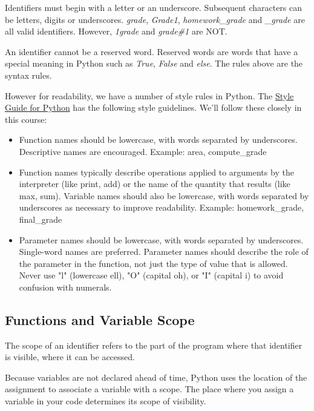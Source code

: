 \documentclass{article}
\begin{document}
Identifiers must begin with a letter or an underscore.  Subsequent characters can be letters, digits or underscores.  \textit{grade}, \textit{Grade1}, \textit{homework{\_}grade} and \textit{{\_}grade} are all valid identifiers. However, \textit{1grade} and \textit{grade{\#}1} are NOT.


An identifier  cannot be a reserved word.  Reserved words are words that have a special meaning in Python such as \textit{True}, \textit{False} and \textit{else}.  
The rules above are the syntax rules.  

However for readability,  we have a number of style rules in Python. The \href{https://www.python.org/dev/peps/pep-0008/}{Style Guide for Python} has the following style guidelines.  We'll follow these closely in this course:

\begin{itemize}
\item Function names should be lowercase, with words separated by underscores. Descriptive names are encouraged.
Example: area, compute{\_}grade

\item Function names typically describe operations applied to arguments by the interpreter (like print, add) or the name of the quantity that results (like max, sum).
Variable names should also be lowercase, with words separated by underscores as necessary to improve readability.
Example: homework{\_}grade,  final{\_}grade

\item Parameter names should be lowercase, with words separated by underscores. Single-word names are preferred.
Parameter names should describe the role of the parameter in the function, not just the type of value that is allowed.
Never use "l" (lowercase ell), "O" (capital oh), or "I" (capital i) to avoid confusion with numerals. 
\end{itemize}

\subsection{Functions and Variable Scope}

The scope of an identifier refers to the part of the program where that identifier is visible, where it can be accessed.

Because variables are not declared ahead of time, Python uses the location of the assignment to associate a variable with a scope. The place where you assign a variable in your code determines its scope of visibility.
\end{document}
